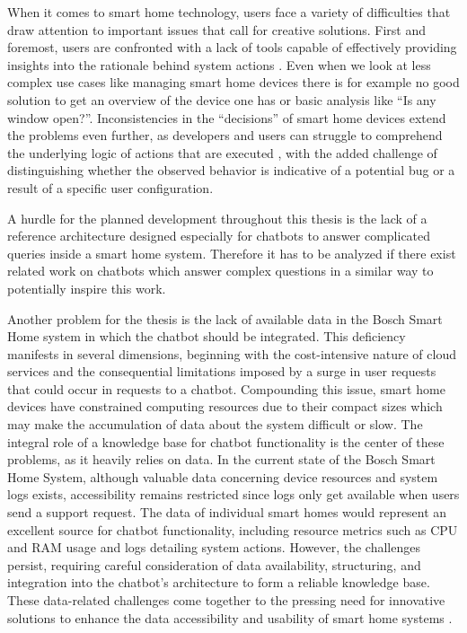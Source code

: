 When it comes to smart home technology, users face a variety of difficulties that draw attention to important issues that call for creative solutions. First and foremost, users are confronted with a lack of tools capable of effectively providing insights into the rationale behind system actions \cite{kok2022explainableartificialintelligencexai}.
Even when we look at less complex use cases like managing smart home devices there is for example no good solution to get an overview of the device one has or basic analysis like ``Is any window open?''.
Inconsistencies in the ``decisions'' of smart home devices extend the problems even further, as developers and users can struggle to comprehend the underlying logic of actions that are executed \cite{kok2022explainableartificialintelligencexai}, with the added challenge of distinguishing whether the observed behavior is indicative of a potential bug or a result of a specific user configuration.

A hurdle for the planned development throughout this thesis is the lack of a reference architecture designed especially for chatbots to answer complicated queries inside a smart home system.
Therefore it has to be analyzed if there exist related work on chatbots which answer complex questions in a similar way to potentially inspire this work.

Another problem for the thesis is the lack of available data in the Bosch Smart Home system in which the chatbot should be integrated.
This deficiency manifests in several dimensions, beginning with the cost-intensive nature of cloud services and the consequential limitations imposed by a surge in user requests that could occur in requests to a chatbot. 
Compounding this issue, smart home devices have constrained computing resources due to their compact sizes which may make the accumulation of data about the system difficult or slow. 
The integral role of a knowledge base for chatbot functionality is the center of these problems, as it heavily relies on data. 
In the current state of the Bosch Smart Home System, although valuable data concerning device resources and system logs exists, accessibility remains restricted since logs only get available when users send a support request.
The data of individual smart homes would represent an excellent source for chatbot functionality, including resource metrics such as CPU and RAM usage and logs detailing system actions.
However, the challenges persist, requiring careful consideration of data availability, structuring, and integration into the chatbot's architecture to form a reliable knowledge base. 
These data-related challenges come together to the pressing need for innovative solutions to enhance the data accessibility and usability of smart home systems \cite{7753232}.

